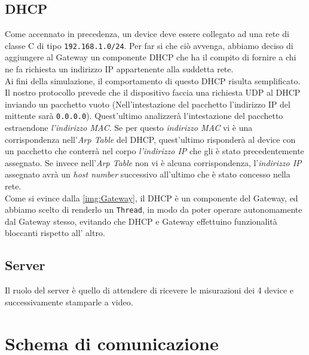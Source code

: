 \documentclass[a4paper,12pt]{report}
\begin{document}
\subsection*{DHCP}
Come accennato in precedenza, un device deve essere collegato ad una rete di classe C di tipo \texttt{192.168.1.0/24}. Per far si che ciò avvenga, abbiamo deciso di aggiungere al Gateway un componente DHCP che ha il compito di fornire a chi ne fa richiesta un indirizzo IP appartenente alla suddetta rete.\\
Ai fini della simulazione, il comportamento di questo DHCP risulta semplificato. Il nostro protocollo prevede che il dispositivo faccia una richiesta UDP al DHCP inviando un pacchetto vuoto (Nell'intestazione del pacchetto l'indirizzo IP del mittente sarà \texttt{0.0.0.0}). Quest'ultimo analizzerà l'intestazione del pacchetto estraendone \textit{l'indirizzo MAC}. Se per questo \textit{indirizzo MAC} vi è una corrispondenza nell'\textit{Arp Table} del DHCP, quest'ultimo risponderà al device con un pacchetto che conterrà nel corpo \textit{l'indirizzo IP} che gli è stato precedentemente assegnato. Se invece nell'\textit{Arp Table} non vi è alcuna corrispondenza, l'\textit{indirizzo IP} assegnato avrà un \textit{host number} successivo all'ultimo che è stato concesso nella rete.\\
Come si evince dalla \cref{img:Gateway}, il DHCP è un componente del Gateway, ed abbiamo scelto di renderlo un \texttt{Thread}, in modo da poter operare autonomamente dal Gateway stesso, evitando che DHCP e Gateway effettuino funzionalità bloccanti rispetto all' altro.

\subsection*{Server}
Il ruolo del server è quello di attendere di ricevere le misurazioni dei 4 device e successivamente stamparle a video. 

\section{Schema di comunicazione}
\end{document}
